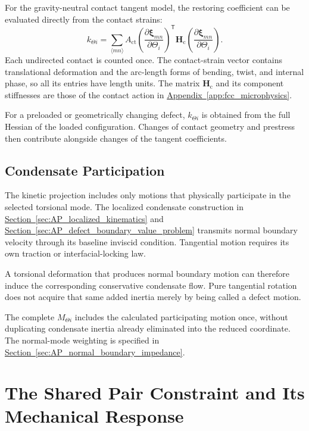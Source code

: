 For the gravity-neutral contact tangent model, the restoring coefficient can be evaluated directly from the contact strains:
\begin{equation}
    \boxed{
    k_{\Theta i}
    =\sum_{\langle mn\rangle}A_{\mathrm{ct}}
    \left(\frac{\partial\boldsymbol\xi_{mn}}{\partial\Theta_i}\right)^{\mathsf T}
    \mathbf H_{\mathrm c}
    \left(\frac{\partial\boldsymbol\xi_{mn}}{\partial\Theta_i}\right)
    }.
\end{equation}
Each undirected contact is counted once. The contact-strain vector contains translational deformation and the arc-length forms of bending, twist, and internal phase, so all its entries have length units. The matrix $\mathbf H_{\mathrm c}$ and its component stiffnesses are those of the contact action in \hyperref[app:fcc_microphysics]{Appendix~\ref*{app:fcc_microphysics}}.

For a preloaded or geometrically changing defect, $k_{\Theta i}$ is obtained from the full Hessian of the loaded configuration. Changes of contact geometry and prestress then contribute alongside changes of the tangent coefficients.

\subsection{Condensate Participation}

The kinetic projection includes only motions that physically participate in the selected torsional mode. The localized condensate construction in \hyperref[sec:AP_localized_kinematics]{Section~\ref*{sec:AP_localized_kinematics}} and \hyperref[sec:AP_defect_boundary_value_problem]{Section~\ref*{sec:AP_defect_boundary_value_problem}} transmits normal boundary velocity through its baseline inviscid condition. Tangential motion requires its own traction or interfacial-locking law.

A torsional deformation that produces normal boundary motion can therefore induce the corresponding conservative condensate flow. Pure tangential rotation does not acquire that same added inertia merely by being called a defect motion.

The complete $M_{\Theta i}$ includes the calculated participating motion once, without duplicating condensate inertia already eliminated into the reduced coordinate. The normal-mode weighting is specified in \hyperref[sec:AP_normal_boundary_impedance]{Section~\ref*{sec:AP_normal_boundary_impedance}}.

\section{The Shared Pair Constraint and Its Mechanical Response}

